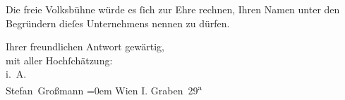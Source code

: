 \pstart
           Die freie Volksbühne würde es{ }ſich zur Ehre
               rechnen, Ihren Namen unter den Begründern dieſes  Unternehmens nennen zu dürfen.\pend
           
\pstart
           Ihrer freundlichen Antwort gewärtig, {\\[\baselineskip]}mit aller Hochſchätzung:{\\[\baselineskip]}i. A.{\\[\baselineskip]}\spacefill\mbox{Stefan Großmann}\pend
           \leftskip=0em{}
\pstart
           \noindent{}Wien I. Graben 29\textsuperscript{a}\pend
           \endnumbering{}  \newcommand{\dateiname}{L01595}\newcommand{\titel}{Stefan Großmann an Arthur Schnitzler, 4. 5. 1906}\newcommand{\editorInnen}{Herausgegeben von Martin Anton Müller}
